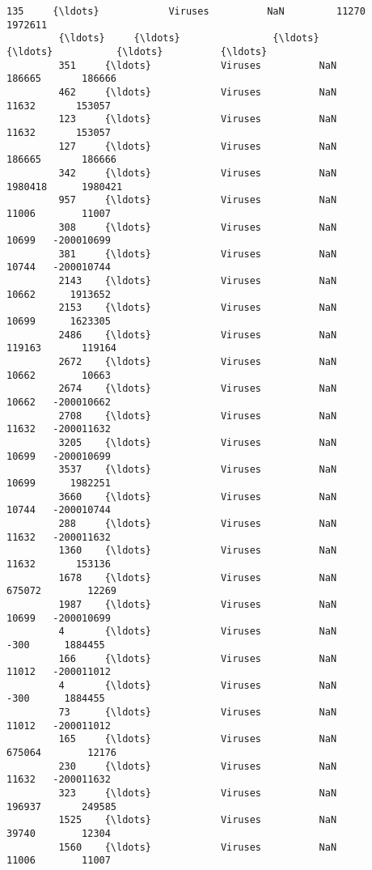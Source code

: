 \documentclass[11pt]{article}
\begin{document}
\begin{Verbatim}[commandchars=\\\{\}]
         135     {\ldots}            Viruses          NaN         11270      1972611   
         {\ldots}     {\ldots}                {\ldots}          {\ldots}           {\ldots}          {\ldots}   
         351     {\ldots}            Viruses          NaN        186665       186666   
         462     {\ldots}            Viruses          NaN         11632       153057   
         123     {\ldots}            Viruses          NaN         11632       153057   
         127     {\ldots}            Viruses          NaN        186665       186666   
         342     {\ldots}            Viruses          NaN       1980418      1980421   
         957     {\ldots}            Viruses          NaN         11006        11007   
         308     {\ldots}            Viruses          NaN         10699   -200010699   
         381     {\ldots}            Viruses          NaN         10744   -200010744   
         2143    {\ldots}            Viruses          NaN         10662      1913652   
         2153    {\ldots}            Viruses          NaN         10699      1623305   
         2486    {\ldots}            Viruses          NaN        119163       119164   
         2672    {\ldots}            Viruses          NaN         10662        10663   
         2674    {\ldots}            Viruses          NaN         10662   -200010662   
         2708    {\ldots}            Viruses          NaN         11632   -200011632   
         3205    {\ldots}            Viruses          NaN         10699   -200010699   
         3537    {\ldots}            Viruses          NaN         10699      1982251   
         3660    {\ldots}            Viruses          NaN         10744   -200010744   
         288     {\ldots}            Viruses          NaN         11632   -200011632   
         1360    {\ldots}            Viruses          NaN         11632       153136   
         1678    {\ldots}            Viruses          NaN        675072        12269   
         1987    {\ldots}            Viruses          NaN         10699   -200010699   
         4       {\ldots}            Viruses          NaN          -300      1884455   
         166     {\ldots}            Viruses          NaN         11012   -200011012   
         4       {\ldots}            Viruses          NaN          -300      1884455   
         73      {\ldots}            Viruses          NaN         11012   -200011012   
         165     {\ldots}            Viruses          NaN        675064        12176   
         230     {\ldots}            Viruses          NaN         11632   -200011632   
         323     {\ldots}            Viruses          NaN        196937       249585   
         1525    {\ldots}            Viruses          NaN         39740        12304   
         1560    {\ldots}            Viruses          NaN         11006        11007   
         

\end{Verbatim}
\end{document}
